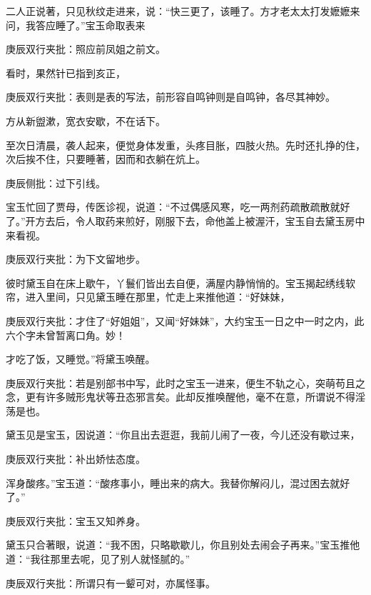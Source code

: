 \begin{parag}
    二人正说著，只见秋纹走进来，说：“快三更了，该睡了。方才老太太打发嬷嬷来问，我答应睡了。”宝玉命取表来\begin{note}庚辰双行夹批：照应前凤姐之前文。\end{note}看时，果然针已指到亥正，\begin{note}庚辰双行夹批：表则是表的写法，前形容自鸣钟则是自鸣钟，各尽其神妙。\end{note}方从新盥漱，宽衣安歇，不在话下。
\end{parag}


\begin{parag}
    至次日清晨，袭人起来，便觉身体发重，头疼目胀，四肢火热。先时还扎挣的住，次后挨不住，只要睡著，因而和衣躺在炕上。\begin{note}庚辰侧批：过下引线。\end{note}宝玉忙回了贾母，传医诊视，说道：“不过偶感风寒，吃一两剂药疏散疏散就好了。”开方去后，令人取药来煎好，刚服下去，命他盖上被渥汗，宝玉自去黛玉房中来看视。\begin{note}庚辰双行夹批：为下文留地步。\end{note}
\end{parag}


\begin{parag}
    彼时黛玉自在床上歇午，丫鬟们皆出去自便，满屋内静悄悄的。宝玉揭起绣线软帘，进入里间，只见黛玉睡在那里，忙走上来推他道：“好妹妹，\begin{note}庚辰双行夹批：才住了“好姐姐”，又闻“好妹妹”，大约宝玉一日之中一时之内，此六个字未曾暂离口角。妙！\end{note}才吃了饭，又睡觉。”将黛玉唤醒。\begin{note}庚辰双行夹批：若是别部书中写，此时之宝玉一进来，便生不轨之心，突萌苟且之念，更有许多贼形鬼状等丑态邪言矣。此却反推唤醒他，毫不在意，所谓说不得淫荡是也。\end{note}黛玉见是宝玉，因说道：“你且出去逛逛，我前儿闹了一夜，今儿还没有歇过来，\begin{note}庚辰双行夹批：补出娇怯态度。\end{note}浑身酸疼。”宝玉道：“酸疼事小，睡出来的病大。我替你解闷儿，混过困去就好了。”\begin{note}庚辰双行夹批：宝玉又知养身。\end{note}黛玉只合著眼，说道：“我不困，只略歇歇儿，你且别处去闹会子再来。”宝玉推他道：“我往那里去呢，见了别人就怪腻的。”\begin{note}庚辰双行夹批：所谓只有一颦可对，亦属怪事。\end{note}
\end{parag}


